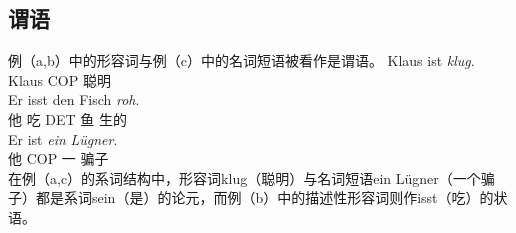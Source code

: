 \subsection{谓语}
例（a,b）中的形容词与例（c）中的名词短语被看作是谓语。
\eal
\ex 
\gll Klaus ist \emph{klug}.\\
	 Klaus COP 聪明\\
\ex 
\gll Er isst den Fisch \emph{roh}.\\
	 他 吃 DET 鱼 生的\\
\ex 
\gll Er ist \emph{ein} \emph{Lügner}.\\
     他 COP 一 骗子\\
\zl
在例（a,c）的系词结构中，形容词klug（聪明）与名词短语ein Lügner（一个骗子）都是系词sein（是）的论元，而例（b）中的描述性形容词则作isst（吃）的状语。

